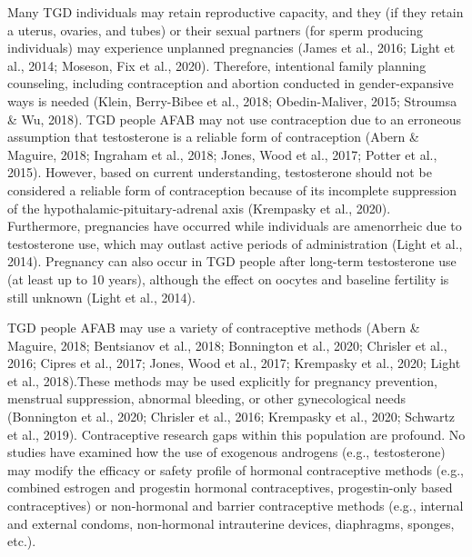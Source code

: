 \documentclass[
]{book}
\begin{document}
Many TGD individuals may retain reproductive
capacity, and they (if they retain a uterus, ovaries,
and tubes) or their sexual partners (for sperm
producing individuals) may experience unplanned
pregnancies (James et al., 2016; Light et al., 2014;
Moseson, Fix et al., 2020). Therefore, intentional
family planning counseling, including contraception and abortion conducted in gender-expansive
ways is needed (Klein, Berry-Bibee et al., 2018;
Obedin-Maliver, 2015; Stroumsa \& Wu, 2018).
TGD people AFAB may not use contraception due
to an erroneous assumption that testosterone is a
reliable form of contraception (Abern \& Maguire,
2018; Ingraham et al., 2018; Jones, Wood et al.,
2017; Potter et al., 2015). However, based on current understanding, testosterone should not be
considered a reliable form of contraception because
of its incomplete suppression of the
hypothalamic-pituitary-adrenal axis (Krempasky
et al., 2020). Furthermore, pregnancies have
occurred while individuals are amenorrheic due
to testosterone use, which may outlast active periods of administration (Light et al., 2014). Pregnancy
can also occur in TGD people after long-term
testosterone use (at least up to 10 years), although
the effect on oocytes and baseline fertility is still
unknown (Light et al., 2014).

TGD people AFAB may use a variety of contraceptive methods (Abern \& Maguire, 2018;
Bentsianov et al., 2018; Bonnington et al., 2020;
Chrisler et al., 2016; Cipres et al., 2017; Jones,
Wood et al., 2017; Krempasky et al., 2020; Light
et al., 2018).These methods may be used explicitly
for pregnancy prevention, menstrual suppression,
abnormal bleeding, or other gynecological needs
(Bonnington et al., 2020; Chrisler et al., 2016;
Krempasky et al., 2020; Schwartz et al., 2019).
Contraceptive research gaps within this population
are profound. No studies have examined how the
use of exogenous androgens (e.g., testosterone)
may modify the efficacy or safety profile of hormonal contraceptive methods (e.g., combined
estrogen and progestin hormonal contraceptives,
progestin-only based contraceptives) or
non-hormonal and barrier contraceptive methods
(e.g., internal and external condoms, non-hormonal
intrauterine devices, diaphragms, sponges, etc.).
\end{document}
